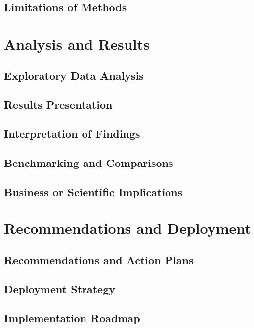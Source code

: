 \documentclass[11pt,a4paper]{article}
\begin{document}
\subsection{Limitations of Methods}


\section{Analysis and Results}

\subsection{Exploratory Data Analysis}

\subsection{Results Presentation}

\subsection{Interpretation of Findings}

\subsection{Benchmarking and Comparisons}

\subsection{Business or Scientific Implications}


\section{Recommendations and Deployment}

\subsection{Recommendations and Action Plans}

\subsection{Deployment Strategy}

\subsection{Implementation Roadmap}
\end{document}
